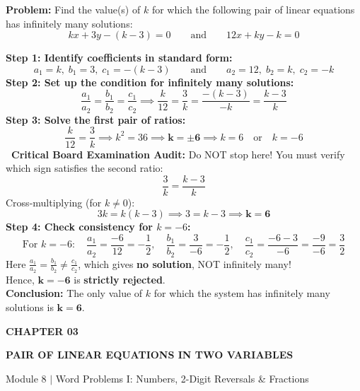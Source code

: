 \documentclass[10pt,a4paper]{article}
\newcommand{\chapterbanner}[4]{%
  \begin{tcolorbox}[enhanced,colback=bluepale,colframe=bluepale,boxrule=0pt,arc=2mm,
    left=3.5mm,right=3.5mm,top=1.8mm,bottom=1.8mm]
    {\footnotesize\bfseries\color{gold}CHAPTER #1\hfill\color{blue}#4}\par\vspace{0.4mm}
    {\Large\bfseries\color{navy}#2}\par
    {\small\color{muted}#3}
  \end{tcolorbox}\vspace{0.8mm}
}
\newcommand{\CoreTag}{\tcbox[colback=greenpale,colframe=green!40,boxrule=.3pt,arc=1mm,left=1.5mm,right=1.5mm,top=.5mm,bottom=.5mm]{\scriptsize\bfseries\color{green}CORE SYLLABUS}}
\newcommand{\TrapTag}{\tcbox[colback=redpale,colframe=reddeep!40,boxrule=.3pt,arc=1mm,left=1.5mm,right=1.5mm,top=.5mm,bottom=.5mm]{\scriptsize\bfseries\color{reddeep}TRAP ALERT}}
\begin{document}
\vspace{0.8mm}
\begin{conceptBox}[title={Worked Archetype 7 $\vert$ The Dual-Pair Consistency Trap in Infinite Solutions},fonttitle=\bfseries\color{navy}]
  \textbf{Problem:} Find the value(s) of $k$ for which the following pair of linear equations has infinitely many solutions:
  $$kx + 3y - (k - 3) = 0 \qquad \text{and} \qquad 12x + ky - k = 0$$
  \par\vspace{0.6mm}\noindent
  \textbf{Step 1: Identify coefficients in standard form:}
  $$a_1 = k, \; b_1 = 3, \; c_1 = -(k - 3) \qquad \text{and} \qquad a_2 = 12, \; b_2 = k, \; c_2 = -k$$
  \textbf{Step 2: Set up the condition for infinitely many solutions:}
  $$\frac{a_1}{a_2} = \frac{b_1}{b_2} = \frac{c_1}{c_2} \implies \frac{k}{12} = \frac{3}{k} = \frac{-(k - 3)}{-k} = \frac{k - 3}{k}$$
  \textbf{Step 3: Solve the first pair of ratios:}
  $$\frac{k}{12} = \frac{3}{k} \implies k^2 = 36 \implies \mathbf{k = \pm 6} \implies k = 6 \quad \text{or} \quad k = -6$$
  \textbf{\TrapTag\ Critical Board Examination Audit:} Do NOT stop here! You must verify which sign satisfies the second ratio:
  $$\frac{3}{k} = \frac{k - 3}{k}$$
  Cross-multiplying (for $k \neq 0$):
  $$3k = k(k - 3) \implies 3 = k - 3 \implies \mathbf{k = 6}$$
  \textbf{Step 4: Check consistency for $k = -6$:}
  $$\text{For } k = -6: \quad \frac{a_1}{a_2} = \frac{-6}{12} = -\frac{1}{2}, \quad \frac{b_1}{b_2} = \frac{3}{-6} = -\frac{1}{2}, \quad \frac{c_1}{c_2} = \frac{-6 - 3}{-6} = \frac{-9}{-6} = \frac{3}{2}$$
  Here $\frac{a_1}{a_2} = \frac{b_1}{b_2} \neq \frac{c_1}{c_2}$, which gives \textbf{no solution}, NOT infinitely many!\\
  Hence, $\mathbf{k = -6}$ is \textbf{strictly rejected}.\\
  \textbf{Conclusion:} The only value of $k$ for which the system has infinitely many solutions is $\mathbf{k = 6}$.
\end{conceptBox}

\newpage

\thispagestyle{fancy}
\vspace*{0mm}

\chapterbanner{03}{PAIR OF LINEAR EQUATIONS IN TWO VARIABLES}{Module 8 $\vert$ Word Problems I: Numbers, 2-Digit Reversals \& Fractions}{\CoreTag}
\end{document}
